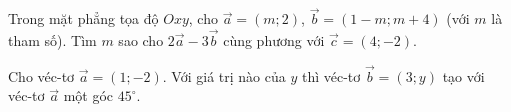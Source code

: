 \begin{bt}%
	Trong mặt phẳng tọa độ $Oxy$, cho $\overrightarrow{a}=(m;2)$, $\overrightarrow{b}=(1-m;m+4)$ (với $m$ là tham số). Tìm $m$ sao cho $2\overrightarrow{a}-3\overrightarrow{b}$ cùng phương với $\overrightarrow{c}=(4;-2)$.
\end{bt}

\begin{bt}%
	Cho véc-tơ $\overrightarrow{a} = (1; - 2)$. Với giá trị nào của $y$ thì véc-tơ $\overrightarrow{b} = (3; y)$ tạo với véc-tơ $\overrightarrow{a}$ một góc $45^{\circ}$.
\end{bt}

